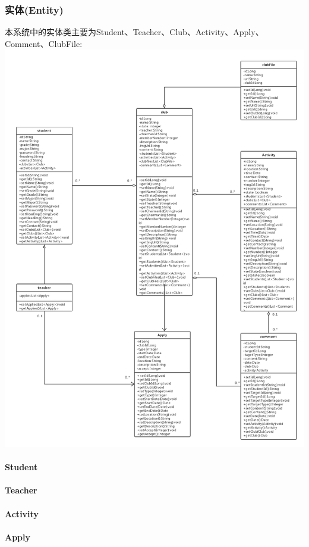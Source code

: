\documentclass[UTF8]{ctexart}
\begin{document}
\subsubsection{实体(Entity)}
本系统中的实体类主要为Student、Teacher、Club、Activity、Apply、Comment、ClubFile:
\includegraphics[width = 1.0\textwidth]{xianhuo-class.png}

\paragraph{Student}
\paragraph{Teacher}
\paragraph{Activity}
\paragraph{Apply}
\end{document}
